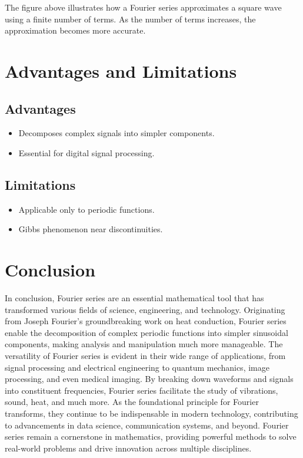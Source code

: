 \documentclass[12pt,a4paper]{article}
\begin{document}
The figure above illustrates how a Fourier series approximates a square wave using a finite number of terms. As the number of terms increases, the approximation becomes more accurate.

\section{Advantages and Limitations}
\subsection*{Advantages}
\begin{itemize}
    \item Decomposes complex signals into simpler components.
    \item Essential for digital signal processing.
\end{itemize}

\subsection*{Limitations}
\begin{itemize}
    \item Applicable only to periodic functions.
    \item Gibbs phenomenon near discontinuities.
\end{itemize}

\section{Conclusion}
In conclusion, Fourier series are an essential mathematical tool that has transformed various fields of science, engineering, and technology. Originating from Joseph Fourier's groundbreaking work on heat conduction, Fourier series enable the decomposition of complex periodic functions into simpler sinusoidal components, making analysis and manipulation much more manageable. The versatility of Fourier series is evident in their wide range of applications, from signal processing and electrical engineering to quantum mechanics, image processing, and even medical imaging. By breaking down waveforms and signals into constituent frequencies, Fourier series facilitate the study of vibrations, sound, heat, and much more. As the foundational principle for Fourier transforms, they continue to be indispensable in modern technology, contributing to advancements in data science, communication systems, and beyond. Fourier series remain a cornerstone in mathematics, providing powerful methods to solve real-world problems and drive innovation across multiple disciplines.
\end{document}
